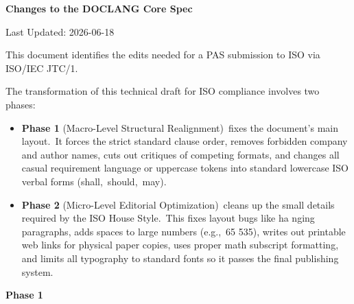 \documentclass[11pt,a4paper]{article}
\begin{document}
\textbf{Changes to the DOCLANG Core Spec}

Last Updated: 2026-06-18

This document identifies the edits needed for a PAS submission to ISO via ISO/IEC JTC/1.

The transformation of this technical draft for ISO compliance involves two phases:

\begin{itemize}
\item \textbf{Phase 1} (Macro-Level Structural Realignment) fixes the document's main layout. It forces the strict standard clause order, removes forbidden company and author names, cuts out critiques of competing formats, and changes all casual requirement language or uppercase tokens into standard lowercase ISO verbal forms (shall, should, may).
\item \textbf{Phase 2} (Micro-Level Editorial Optimization) cleans up the small details required by the ISO House Style. This fixes layout bugs like ha nging paragraphs, adds spaces to large numbers (e.g., 65 535), writes out printable web links for physical paper copies, uses proper math subscript formatting, and limits all typography to standard fonts so it passes the final publishing system.
\end{itemize}

\textbf{Phase 1}
\end{document}
